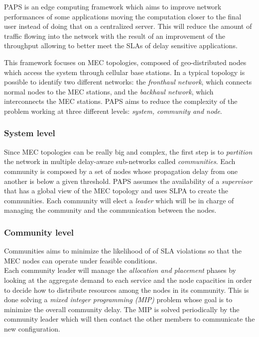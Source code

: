 PAPS is an edge computing framework which aims to improve network performances of some 
applications moving the computation closer to the final user instead of doing that on 
a centralized server. This will reduce the amount of traffic flowing into the network
with the result of an improvement of the throughput allowing to better meet the SLAs
of delay sensitive applications.

This framework focuses on MEC topologies, composed of geo-distributed nodes which access
the system through cellular base stations. In a typical topology is possible to identify
two different networks: the \textit{fronthaul network}, which connects normal nodes to 
the MEC stations, and the \textit{backhaul network}, which interconnects the MEC stations.
PAPS aims to reduce the complexity of the problem working at three different levels: 
\textit{system, community and node}. 
\\
\subsubsection*{System level}
Since MEC topologies can be really big and complex, the first step is to \textit{partition}
the network in multiple delay-aware sub-networks called \textit{communities}. Each community
is composed by a set of nodes whose propagation delay from one another is below a given 
threshold. PAPS assumes the availability of a \textit{supervisor} that has a global view of
the MEC topology and uses SLPA \cite{SLPA} to create the communities. Each community will
elect a \textit{leader} which will be in charge of managing the community and the communication
between the nodes.

\subsubsection*{Community level}
Communities aims to minimize the likelihood of of SLA violations so that the MEC nodes
can operate under feasible conditions.\\
Each community leader will manage the \textit{allocation and placement} phases by looking at 
the aggregate demand to each service and the node capacities in order to decide how to 
distribute resources among the nodes in its community. This is done solving a \textit{mixed
integer programming (MIP)} problem whose goal is to minimize the overall community delay. 
The MIP is solved periodically by the community leader which will then contact the other members
to communicate the new configuration.